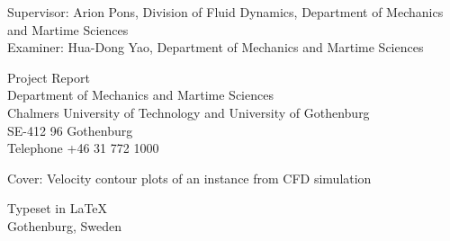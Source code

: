 Supervisor: Arion Pons, Division of Fluid Dynamics, Department of Mechanics and Martime Sciences\\
Examiner: Hua-Dong Yao, Department of Mechanics and Martime Sciences \setlength{\parskip}{1cm}

Project Report \the\year\\	%
Department of Mechanics and Martime Sciences\\
Chalmers University of Technology and University of Gothenburg\\
SE-412 96 Gothenburg\\
Telephone +46 31 772 1000 \setlength{\parskip}{0.5cm}

\vfill
Cover: Velocity contour plots of an instance from CFD simulation 


Typeset in \LaTeX \\
Gothenburg, Sweden \the\year

